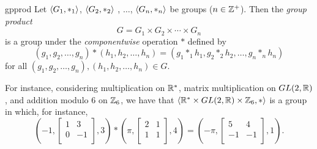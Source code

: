 \begin{example}{gpprod}
Let $\langle G_1,*_1\rangle$, $\langle G_2,*_2\rangle$ , $\ldots$, $\langle G_n,*_n\rangle$ be groups ($n\in \mathbb{Z}^+$).  Then the \textit{group product}
$$G=G_1\times G_2\times \cdots \times G_n$$ is a group under the \textit{componentwise} operation $*$ defined by
$$(g_1,g_2,\ldots, g_n)*(h_1,h_2,\ldots,h_n)=(g_1*_1h_1, g_2*_2h_2,\ldots, g_n*_nh_n)$$ for all $(g_1,g_2,\ldots, g_n),(h_1,h_2,\ldots,h_n)\in G$.

\bigskip
For instance, considering multiplication on $\mathbb{R}^*$, matrix multiplication on $GL(2,\mathbb{R})$, and addition modulo $6$ on $\mathbb{Z}_6$, we have that $\langle\mathbb{R}^*\times GL(2,\mathbb{R}) \times \mathbb{Z}_6,*\rangle$ is a group in which, for instance, $$\left(-1, \left[
                                                                         \begin{array}{cr}
                                                                           1 & 3 \\
                                                                           0 & -1 \\
                                                                         \end{array}
                                                                       \right],
                                                                       3\right)
                                                                       *\left(\pi,
                                                                       \left[
                                                                         \begin{array}{cc}
                                                                           2 & 1 \\
                                                                           1 & 1 \\
                                                                         \end{array}
                                                                       \right],4\right)=\left(-\pi, \left[
                                                                         \begin{array}{rr}
                                                                           5 & 4 \\
                                                                           -1 & -1 \\
                                                                         \end{array}
                                                                       \right],1\right).  $$
                                                                       \end{example}

